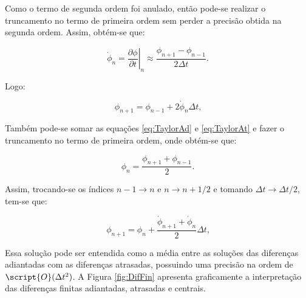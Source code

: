 Como o termo de segunda ordem foi anulado, então pode-se realizar o truncamento no termo de primeira ordem sem perder a precisão obtida na segunda ordem. Assim, obtém-se que:

\begin{equation}
    \dot{\phi}_n=\left.\frac{\partial\phi}{\partial t}\right|_n\approx\frac{\phi_{n+1}-\phi_{n-1}}{2\Delta t}\text{.}
\end{equation}

\noindent Logo:

\begin{equation}
    \phi_{n+1}=\phi_{n-1}+2\dot{\phi}_n\Delta t\text{,}
\end{equation}

Também pode-se somar as equações \ref{eq:TaylorAd} e \ref{eq:TaylorAt} e fazer o truncamento no termo de primeira ordem, onde obtém-se que:

\begin{equation}
    \phi_n=\frac{\phi_{n+1}+\phi_{n-1}}{2}\text{.}
\end{equation}

Assim, trocando-se os índices $n-1\to n$ e $n\to n+1/2$ e tomando $\Delta t\to\Delta t/2$, tem-se que:

\begin{equation}
    \phi_{n+1}=\phi_n+\frac{\dot{\phi}_{n+1}+\dot{\phi}_n}{2}\Delta t\text{,}
\end{equation}

Essa solução pode ser entendida como a média entre as soluções das diferenças adiantadas com as diferenças atrasadas, possuindo uma precisão na ordem de $\script{O}(\Delta t^2)$. A Figura \ref{fig:DifFin} apresenta graficamente a interpretação das diferenças finitas adiantadas, atrasadas e centrais.

